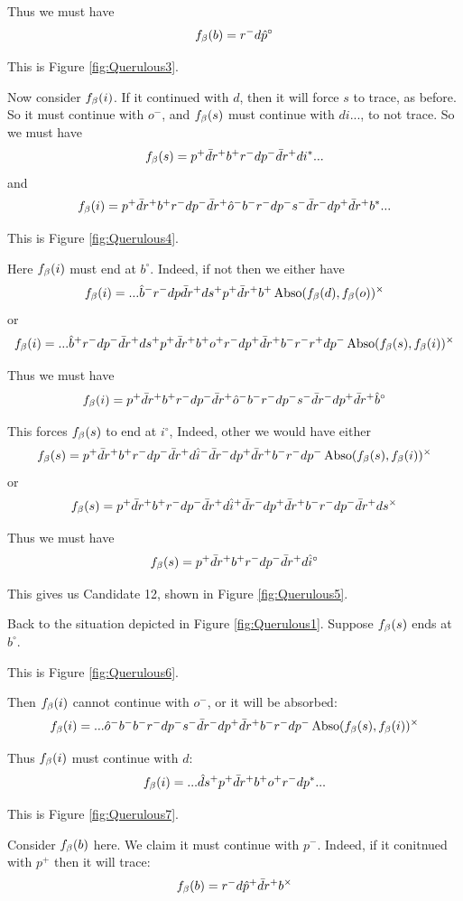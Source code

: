 Thus we must have
\[
f_\beta(b) = r^- d \hat{p}^\circ
\]

This is Figure \ref{fig:Querulous3}.

Now consider $f_\beta(i)$. If it continued with $d$, then it will force $s$ to trace, as before. So it must continue with $o^-$, and $f_\beta(s)$ must continue with $di...$, to not trace. So we must have
\[
f_\beta(s) = p^+ \bar{d} r^+ b^+ r^- d p^- \bar{d} r^+ d i^*...
\]
and
\[
f_\beta(i) = p^+ \bar{d} r^+ b^+ r^- d p^- \bar{d} r^+ \hat{o}^- b^- r^- d p^- s^- \bar{d} r^- d p^+ \bar{d} r^+ b^*...
\]

This is Figure \ref{fig:Querulous4}.

Here $f_\beta(i)$ must end at $b^\circ$. Indeed, if not then we either have
\[
f_\beta(i) =  ... \hat{b}^- r^- d p\bar{d} r^+ d s^+ p^+ \bar{d} r^+ b^+ \operatorname{Abso}(f_\beta(d), f_\beta(o))^\times
\]
or
\[
f_\beta(i) =  ... \hat{b}^+ r^- d p^- \bar{d} r^+ d s^+ p^+ \bar{d} r^+ b^+ o^+ r^- d p^+ \bar{d} r^+ b^- r^- r^+ d p^- \operatorname{Abso}(f_\beta(s), f_\beta(i))^\times
\]

Thus we must have
\[
f_\beta(i) = p^+ \bar{d} r^+ b^+ r^- d p^- \bar{d} r^+ \hat{o}^- b^- r^- d p^- s^- \bar{d} r^- d p^+ \bar{d} r^+ \hat{b}^\circ
\]

This forces $f_\beta(s)$ to end at $i^\circ$, Indeed, other we would have either
\[
f_\beta(s) = p^+ \bar{d} r^+ b^+ r^- d p^- \bar{d} r^+ d \hat{i}^- \bar{d} r^- d p^+ \bar{d} r^+ b^- r^- d p^- \operatorname{Abso}(f_\beta(s), f_\beta(i))^\times
\]
or
\[
f_\beta(s) = p^+ \bar{d} r^+ b^+ r^- d p^- \bar{d} r^+ d \hat{i}^+ \bar{d} r^- d p^+ \bar{d} r^+ b^- r^- d p^- \bar{d} r^+ d s^\times
\]

Thus we must have
\[
f_\beta(s) = p^+ \bar{d} r^+ b^+ r^- d p^- \bar{d} r^+ d \hat{i}^\circ
\]

This gives us Candidate 12, shown in Figure \ref{fig:Querulous5}.

Back to the situation depicted in Figure \ref{fig:Querulous1}. Suppose $f_\beta(s)$ ends at $b^\circ$.

This is Figure \ref{fig:Querulous6}.

Then $f_\beta(i)$ cannot continue with $o^-$, or it will be absorbed:
\[
f_\beta(i) = ...\hat{o}^- b^- b^- r^- d p^- s^- \bar{d} r^- d p^+ \bar{d} r^+ b^- r^- d p^- \operatorname{Abso}(f_\beta(s), f_\beta(i))^\times
\]

Thus $f_\beta(i)$ must continue with $d$:
\[
f_\beta(i) = ...\hat{d} s^+ p^+ \bar{d} r^+ b^+ o^+ r^- d p^*...
\]

This is Figure \ref{fig:Querulous7}.

Consider $f_\beta(b)$ here. We claim it must continue with $p^-$. Indeed, if it conitnued with $p^+$ then it will trace:
\[
f_\beta(b) = r^- d \hat{p}^+ \bar{d} r^+ b^\times
\]

